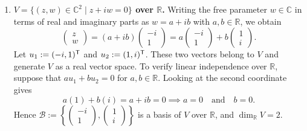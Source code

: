 \begin{exercisesolution*}
\begin{enumerate}[label=\textbf{(\alph*)}]
    \item \textbf{$V = \{(z, w) \in \mathbb{C}^2 \mid z + iw = 0\}$ over $\mathbb{R}$.} Writing the free parameter $w \in \mathbb{C}$ in terms of real and imaginary parts as $w = a + ib$ with $a, b \in \mathbb{R}$, we obtain
    \[
        \begin{pmatrix} z \\ w \end{pmatrix} = (a + ib) \begin{pmatrix} -i \\ 1 \end{pmatrix} = a \begin{pmatrix} -i \\ 1 \end{pmatrix} + b \begin{pmatrix} 1 \\ i \end{pmatrix}.
    \]
    Let $u_1 := (-i, 1)^{\mathsf{T}}$ and $u_2 := (1, i)^{\mathsf{T}}$. These two vectors belong to $V$ and generate $V$ as a real vector space. To verify linear independence over $\mathbb{R}$, suppose that $a u_1 + b u_2 = 0$ for $a, b \in \mathbb{R}$. Looking at the second coordinate gives
    \[
        a(1) + b(i) = a + ib = 0 \implies a = 0 \quad \text{and} \quad b = 0.
    \]
    Hence $\mathcal{B} := \left\{ \left(\begin{smallmatrix} -i \\ 1 \end{smallmatrix}\right), \left(\begin{smallmatrix} 1 \\ i \end{smallmatrix}\right) \right\}$ is a basis of $V$ over $\mathbb{R}$, and $\dim_{\mathbb{R}} V = 2$.
\end{enumerate}
\end{exercisesolution*}


